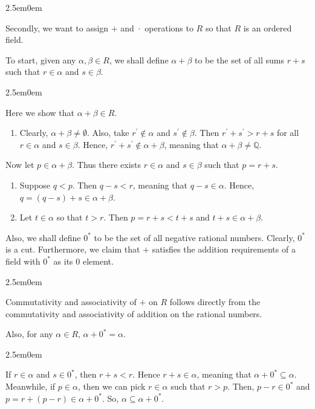 \documentclass{book}
\newcommand{\exTwo}{%
\color{Purple}%
   \fontsize{13}{15}\selectfont%
}
\newcommand{\exP}{%
   \color{Purple}%
   \fontsize{12}{14}\selectfont%
}
\newenvironment{myIndent}{%
   \begin{adjustwidth}{2.5em}{0em}%
}{%
   \end{adjustwidth}%
}
\newcommand{\myHS}{ \hspace{0.5em}}
\newcommand{\retTwo}{\hfill\bigbreak}
\begin{document}
\begin{myIndent}
      Secondly, we want to assign $+$ and $\hspace{0.1em}\cdot\hspace{0.1em}$ operations to $R$ so that $R$ is an ordered field.\retTwo
      
      To start, given any $\alpha, \beta \in R$, we shall define $\alpha + \beta$ to be the set of all sums $r + s$ such that $r \in \alpha$ and $s \in \beta$.
      \begin{myIndent}\exTwo
         Here we show that $\alpha + \beta \in R$.
         \begin{enumerate}
            \item Clearly, $\alpha + \beta \neq \emptyset$. Also, take $r^\prime \notin \alpha$ and $s^\prime \notin \beta$. Then $r^\prime + s^\prime > r + s$ for all $r \in \alpha$ and $s \in \beta$. Hence, $r^\prime + s^\prime \notin \alpha + \beta$, meaning that $\alpha + \beta \neq \mathbb{Q}$.\\ [-9pt]
         \end{enumerate}

         Now let $p \in \alpha + \beta$. Thus there exists $r \in \alpha$ and $s \in \beta$ such that $p = r + s$.\\ [-9pt]

         \begin{enumerate}
            \item[2.] Suppose $q < p$. Then $q - s < r$, meaning that $q - s \in \alpha$. Hence,\\ $q = (q - s) + s \in \alpha + \beta$.\retTwo
            
            \item[3.] Let $t \in \alpha$ so that $t > r$. Then $p = r + s < t + s$ and $t + s \in \alpha + \beta$.\retTwo
         \end{enumerate}
      \end{myIndent}

      Also, we shall define $0^*$ to be the set of all negative rational numbers. Clearly, $0^*$ is a cut. Furthermore, we claim that $+$ satisfies the addition requirements of a field with $0^*$ as its $0$ element.

      \begin{myIndent}\exTwo
         Commutativity and associativity of $+$ on $R$ follows directly from the\\ commutativity and associativity of addition on the rational numbers.\retTwo

         Also, for any $\alpha \in R$,\myHS $\alpha + 0^* = \alpha$.
         \begin{myIndent}\exP
            If $r \in \alpha$ and $s \in 0^*$, then $r + s < r$. Hence $r + s \in \alpha$, meaning that $\alpha + 0^* \subseteq \alpha$. Meanwhile, if $p \in \alpha$, then we can pick $r \in \alpha$ such that $r > p$. Then, $p - r \in 0^*$ and $p = r + (p - r) \in \alpha + 0^*$. So, $\alpha \subseteq \alpha + 0^*$.\retTwo
         \end{myIndent}


\end{myIndent}
\end{myIndent}
\end{document}
